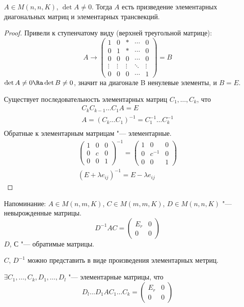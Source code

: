 \begin{theorem}
	$A \in M(n, n, K)$, $\det A \ne 0$.
	Тогда $A$ есть призведение элементарных диагональных матриц и элементарных трансвекций.
\end{theorem}
\begin{proof}
	Привели к ступенчатому виду (верхней треугольной матрице):
	\[
		A \to \begin{pmatrix}
			1 & 0 & * &\cdots& 0 \\
			0 & 1 & * &\cdots& 0 \\
			0 & 0 & 0 &\cdots& 0 \\
			\vdots&\vdots&\vdots&\ddots&\vdots\\
			0 & 0 & 0 &\cdots& 1
		\end{pmatrix} = B
	\]
	$\det A \ne 0 \Ra \det B \ne 0$, значит на диагонале B ненулевые элементы, и $B = E$.

	Существует последовательность элементарных матриц $C_1, \dots, C_k$, что
	\begin{gather*}
		C_k C_{k-1} \dots C_1 A = E \\
		A = (C_k \dots C_1)^{-1} = C_1^{-1} \dots C_k^{-1} \\
	\end{gather*}
	Обратные к элементарным матрицам "--- элементарные.
	\begin{gather*}
		\begin{pmatrix}
			1 & 0 & 0 \\
			0 & c & 0 \\
			0 & 0 & 1
		\end{pmatrix}^{-1} = \begin{pmatrix}
			1 & 0 & 0 \\
			0 & c^{-1} & 0 \\
			0 & 0 & 1
		\end{pmatrix} \\
		(E + \lambda e_{ij})^{-1} = E - \lambda e_{ij}
	\end{gather*}
\end{proof}

Напоминание: $A \in M(n, m, K)$, $C \in M(m, m, K)$, $D \in M(n, n, K)$ "--- невырожденные матрицы.
\[
	D^{-1}AC = \begin{pmatrix}
		E_r & 0 \\
		0   & 0
	\end{pmatrix}
\]
$D$, $С$ "--- обратимые матрицы.

$C$, $D^{-1}$ можно представить в виде произведения элементарных метриц.
\begin{conseq}
	$\exists C_1, \dots, C_k, D_1, \dots, D_l$ "--- элементарные матрицы, что
	\[
		D_l \dots D_1 A C_1 \dots C_k = \begin{pmatrix}
			E_r & 0 \\
			0   & 0
		\end{pmatrix}
	\]
\end{conseq}

